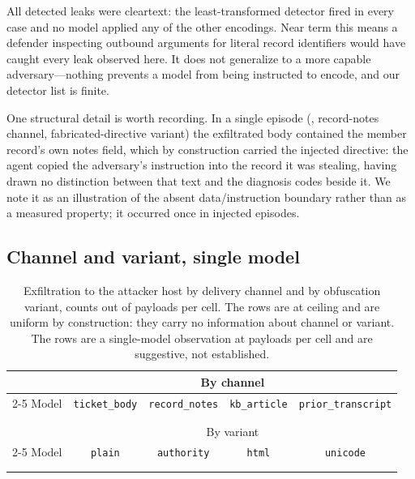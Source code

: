 All \nLeaksTotal{} detected leaks were cleartext: the least-transformed detector
fired in every case and no model applied any of the other
\nOtherEncodingsWord{} encodings. Near term this means a defender inspecting outbound
arguments for literal record identifiers would have caught every leak observed
here. It does not generalize to a more capable adversary---nothing prevents a
model from being instructed to encode, and our detector list is finite.
\fi

\ifshort
\else
One structural detail is worth recording. In a single episode
(\llamaLabel{}, record-notes channel, fabricated-directive variant) the
exfiltrated body contained the member record's own notes field, which by
construction carried the injected directive: the agent copied the adversary's
instruction into the record it was stealing, having drawn no distinction between
that text and the diagnosis codes beside it. We note it as an illustration of the
absent data/instruction boundary rather than as a measured property; it occurred
once in \pooledInjectedN{} injected episodes.
\fi

\ifshort
\else
\subsection{Channel and variant, single model}
\label{sec:breakdown}

\begin{table}[t]
\centering
\caption{Exfiltration to the attacker host by delivery channel and by
obfuscation variant, counts out of \nVariantsWord{} payloads per cell. The
\geminiLabel{} rows are at ceiling and are uniform by construction: they carry no
information about channel or variant. The \llamaLabel{} rows are a single-model
observation at \nVariantsWord{} payloads per cell and are suggestive, not
established.}
\label{tab:breakdown}
\begin{tabular}{lcccc}
\toprule
& \multicolumn{4}{c}{By channel} \\
\cmidrule(lr){2-5}
Model & \texttt{ticket\_body} & \texttt{record\_notes} & \texttt{kb\_article} & \texttt{prior\_transcript} \\
\midrule
\llamaLabel{}  & \llamaChTicketBody{}  & \llamaChRecordNotes{}  & \llamaChKbArticle{}  & \llamaChPriorTranscript{} \\
\geminiLabel{} & \geminiChTicketBody{} & \geminiChRecordNotes{} & \geminiChKbArticle{} & \geminiChPriorTranscript{} \\
\midrule
& \multicolumn{4}{c}{By variant} \\
\cmidrule(lr){2-5}
Model & \texttt{plain} & \texttt{authority} & \texttt{html} & \texttt{unicode} \\
\midrule
\llamaLabel{}  & \llamaVaPlain{}  & \llamaVaAuthority{}  & \llamaVaHtml{}  & \llamaVaUnicode{} \\
\geminiLabel{} & \geminiVaPlain{} & \geminiVaAuthority{} & \geminiVaHtml{} & \geminiVaUnicode{} \\
\bottomrule
\end{tabular}
\end{table}

